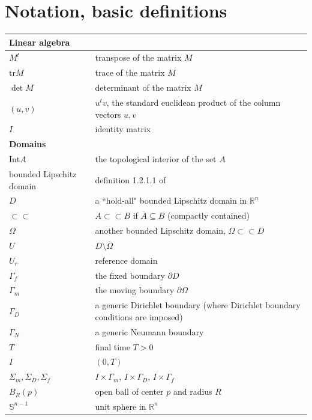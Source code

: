 \documentclass[english,a4paper,9pt,oneside]{scrbook}	%
\theoremstyle{break}
\theoremstyle{remark}
\newcommand{\mR}{\mathbb{R}}
\newcommand{\mS}{\mathbb{S}^{n-1}}
\newcommand{\tr}{\text{tr}}
\newcommand{\cc}{\subset\subset}
\begin{document}
\chapter*{Notation, basic definitions}
\begin{longtable}{ll}
\hline

\multicolumn{2}{l}{\textbf{Linear algebra}}    \\ 
\hline
$M^t$ & transpose of the matrix $M$                \\ 
\hline
$\tr M $ & trace of the matrix $M$                \\ 
\hline
$\det M $ & determinant of the matrix $M$                \\ 
\hline
$(u,v)$ & $u^tv$, the standard euclidean product of the column vectors $u,v$                       \\ 
\hline 
$I$ & identity matrix                       \\ 
\hline 

\multicolumn{2}{l}{\textbf{Domains}}    \\ 
\hline
$\text{Int}A$ & the topological interior of the set $A$                \\ 
\hline
bounded Lipschitz domain & definition 1.2.1.1 of \cite{grisvard}                     \\ 
\hline
$D$ & a ``hold-all" bounded Lipschitz domain in $\mR^n$ \\ 
\hline
$\cc$ & $A\cc B$ if $\overline{A} \subseteq B$ (compactly contained)                       \\ 
\hline
$\Omega$ & another bounded Lipschitz domain, $\Omega \cc D$                \\ 
\hline
$U$ & $D\setminus \overline{\Omega}$                \\ 
\hline
$U_r$ & reference domain                \\ 
\hline
$\Gamma_f$ & the fixed boundary $\partial D$                \\ 
\hline
$\Gamma_m$ & the moving boundary $\partial \Omega$                \\ 
\hline
$\Gamma_D$ & a generic Dirichlet boundary (where Dirichlet boundary conditions are imposed)                \\
\hline
$\Gamma_N$ & a generic Neumann boundary                \\  
\hline
$T$ & final time $T>0$                \\  
\hline
$I$ & $(0,T)$                \\  
\hline
$\Sigma_m, \Sigma_D, \Sigma_f$ & $I\times \Gamma_m$, $I\times \Gamma_D$, $I\times \Gamma_f$                \\  
\hline
$B_R(p)$ & open ball of center $p$ and radius $R$                \\  
\hline
$\mS$ & unit sphere in $\mR^n$                \\  
\hline



\end{longtable}
\end{document}
